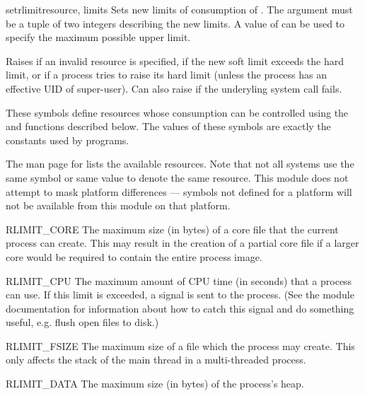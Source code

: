\begin{funcdesc}{setrlimit}{resource, limits}
  Sets new limits of consumption of . The 
  argument must be a tuple  of two
  integers describing the new limits. A value of  can be used to
  specify the maximum possible upper limit.

  Raises  if an invalid resource is specified,
  if the new soft limit exceeds the hard limit, or if a process tries
  to raise its hard limit (unless the process has an effective UID of
  super-user).  Can also raise  if the underyling
  system call fails.
\end{funcdesc}

These symbols define resources whose consumption can be controlled
using the  and  functions
described below. The values of these symbols are exactly the constants
used by \C{} programs.

The \UNIX{} man page for  lists the available
resources.  Note that not all systems use the same symbol or same
value to denote the same resource.  This module does not attempt to
mask platform differences --- symbols not defined for a platform will
not be available from this module on that platform.

\begin{datadesc}{RLIMIT_CORE}
  The maximum size (in bytes) of a core file that the current process
  can create.  This may result in the creation of a partial core file
  if a larger core would be required to contain the entire process
  image.
\end{datadesc}

\begin{datadesc}{RLIMIT_CPU}
  The maximum amount of CPU time (in seconds) that a process can
  use. If this limit is exceeded, a  signal is sent to
  the process. (See the  module documentation for
  information about how to catch this signal and do something useful,
  e.g. flush open files to disk.)
\end{datadesc}

\begin{datadesc}{RLIMIT_FSIZE}
  The maximum size of a file which the process may create.  This only
  affects the stack of the main thread in a multi-threaded process.
\end{datadesc}

\begin{datadesc}{RLIMIT_DATA}
  The maximum size (in bytes) of the process's heap.
\end{datadesc}

